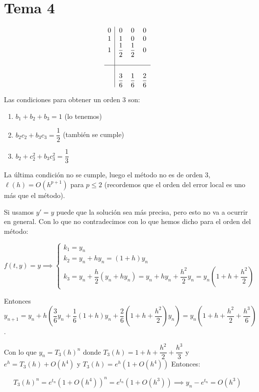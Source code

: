 \documentclass[openany]{book}
\begin{document}
    \setcounter{ex}{15}

    \begin{exercise}
        
    \end{exercise}


    \chapter{Tema 4}

    \setcounter{ex}{3}

    \begin{exercise}
        $$ 
        \begin{array}{c|ccc}
            0 & 0 & 0 & 0\\
            1 & 1 & 0 & 0\\
            1 & \dfrac{1}{2} & \dfrac{1}{2} & 0 \\\\
            \hline\\
            & \dfrac{3}{6} & \dfrac{1}{6} & \dfrac{2}{6}
        \end{array}
        $$

        Las condiciones para obtener un orden 3 son:
        \begin{enumerate}
            \item $ b_1+b_2+b_3 = 1 $ (lo tenemos) 
            \item $ b_2c_2+b_3c_3 = \dfrac{1}{2} $ (también se cumple)
            \item $ b_2+c_2^2+b_3c_3^2 = \dfrac{1}{3} $
        \end{enumerate}
        
        La última condición no se cumple, luego el método no es de orden $ 3 $, $ \ell(h) = O(h^{p+1}) $ para $ p \leq 2 $ (recordemos que el orden del error local es uno más que el método).

        Si usamos $ y'=y $ puede que la solución sea más precisa, pero esto no va a ocurrir en general. Con lo que no contradecimos con lo que hemos dicho para el orden del método:

        $$ f(t,y)=y \implies \left\{
        \begin{array}{l}
            k_1 = y_n\\
            k_2 = y_n+hy_n = (1+h)y_n\\
            k_3 = y_n + \dfrac{h}{2}(y_n+hy_n) = y_n+hy_n+\dfrac{h^2}{2}y_n = y_n\left(1+h+\dfrac{h^2}{2}\right)
        \end{array}
        \right.$$

        Entonces $ y_{n+1} = y_n+h \left( \dfrac{3}{6}y_n + \dfrac{1}{6}(1+h)y_n + \dfrac{2}{6}\left(1+h+\dfrac{h^2}{2}\right) y_n \right) = y_n \left( 1+h+\dfrac{h^2}{2}+\dfrac{h^3}{6} \right) $.

        Con lo que $ y_n = T_{3}(h)^{n} $ donde $ T_{3}(h) = 1+h+\dfrac{h^2}{2}+\dfrac{h^3}{3} $ y $ e^{h} = T_3(h) + O(h^{4}) $ y $ T_3(h) = e^{h}(1+O(h^{4})) $ Entonces:

        $$ T_{3}(h)^{n} =  e^{t_n} (1+O(h^{4}))^{n} = e^{t_n}(1+O(h^{3})) \implies y_n - e^{t_n} = O(h^3)$$

    \end{exercise}
\end{document}
